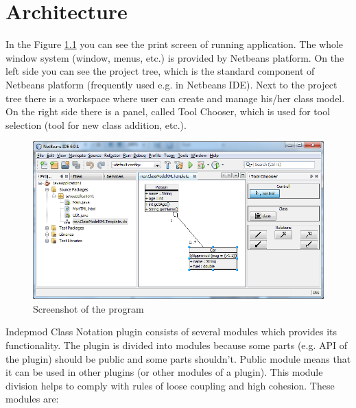 \chapter{Architecture}

In the Figure \ref{f-screenSmallModule} you can see the print screen of running application. The whole window system (window, menus, etc.) is provided by Netbeans platform. On the left side you can see the project tree, which is the standard component of Netbeans platform (frequently used e.g. in Netbeans IDE). Next to the project tree there is a workspace where user can create and manage his/her class model. On the right side there is a panel, called Tool Chooser, which is used for tool selection (tool for new class addition, etc.).

\begin{figure}[!ht]
\begin{center}
\includegraphics[width=\textwidth]{img/screenSmall.png}
\caption{Screenshot of the program}
\label{f-screenSmallModule}
\end{center}
\end{figure}

Indepmod Class Notation plugin consists of several modules which provides its functionality. The plugin is divided into modules because some parts (e.g. API of the plugin) should be public and some parts shouldn't. Public module means that it can be used in other plugins (or other modules of a plugin). This module division helps to comply with rules of loose coupling and high cohesion. These modules are:

